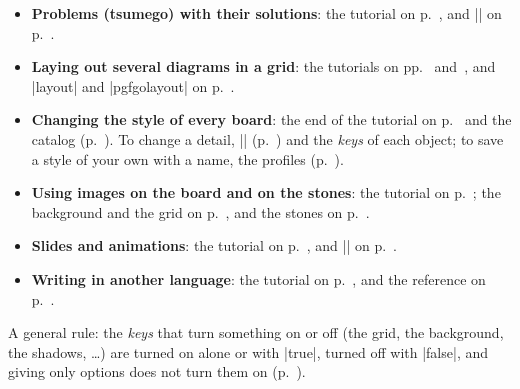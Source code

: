 \begin{itemize}
	\item \textbf{Problems (tsumego) with their solutions}: the tutorial on p.~\pageref{tut:problemas}, and |\sgfproblem| on p.~\pageref{subsec:sgfproblemas}.
	\item \textbf{Laying out several diagrams in a grid}: the tutorials on pp.~\pageref{tut:partida} and~\pageref{tut:problemas}, and |layout| and |pgfgolayout| on p.~\pageref{subsec:disposicion}.
	\item \textbf{Changing the style of every board}: the end of the tutorial on p.~\pageref{tut:posicion} and the catalog (p.~\pageref{sec:catalogo}). To change a detail, |\pgfgoset| (p.~\pageref{sec:configuracion}) and the \emph{keys} of each object; to save a style of your own with a name, the profiles (p.~\pageref{subsec:perfiles}).
	\item \textbf{Using images on the board and on the stones}: the tutorial on p.~\pageref{tut:madera}; the background and the grid on p.~\pageref{sec:tablero}, and the stones on p.~\pageref{subsec:piedrasimagen}.
	\item \textbf{Slides and animations}: the tutorial on p.~\pageref{tut:diapositivas}, and |\sgfanimation| on p.~\pageref{subsec:sgfanimacion}.
	\item \textbf{Writing in another language}: the tutorial on p.~\pageref{tut:idiomas}, and the reference on p.~\pageref{subsec:idiomas}.
\end{itemize}

A general rule: the \emph{keys} that turn something on or off (the grid, the background, the shadows, \ldots) are turned on alone or with |true|, turned off with |false|, and giving only options does not turn them on (p.~\pageref{subsec:prender}).
